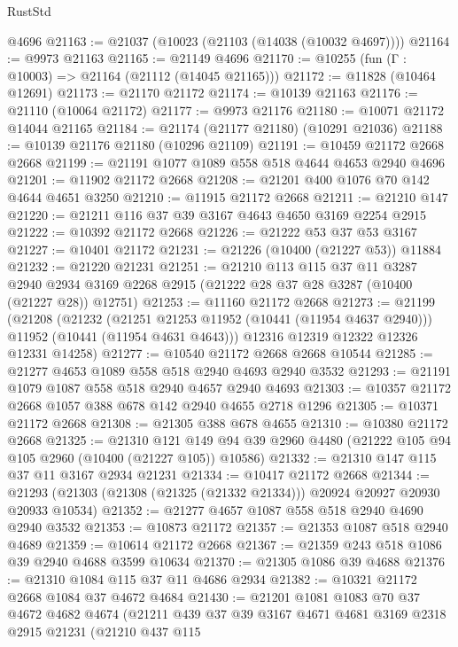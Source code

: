 \begin{lexlean}{RustStd}
\begin{coremodule}
    @4696
@21163 := @21037 (@10023 (@21103 (@14038 (@10032 @4697))))
@21164 := @9973 @21163
@21165 := @21149 @4696
@21170 := @10255 (fun (Γ : @10003) => @21164 (@21112 (@14045 @21165)))
@21172 := @11828 (@10464 @12691)
@21173 := @21170 @21172
@21174 := @10139 @21163
@21176 := @21110 (@10064 @21172)
@21177 := @9973 @21176
@21180 := @10071 @21172 @14044 @21165
@21184 := @21174 (@21177 @21180) (@10291 @21036)
@21188 := @10139 @21176 @21180 (@10296 @21109)
@21191 := @10459 @21172 @2668 @2668
@21199 := @21191 @1077 @1089 @558 @518 @4644 @4653 @2940 @4696
@21201 := @11902 @21172 @2668
@21208 := @21201 @400 @1076 @70 @142 @4644 @4651 @3250
@21210 := @11915 @21172 @2668
@21211 := @21210 @147
@21220 := @21211 @116 @37 @39 @3167 @4643 @4650 @3169 @2254 @2915
@21222 := @10392 @21172 @2668
@21226 := @21222 @53 @37 @53 @3167
@21227 := @10401 @21172
@21231 := @21226 (@10400 (@21227 @53)) @11884
@21232 := @21220 @21231
@21251 := @21210
    @113
    @115
    @37
    @11
    @3287
    @2940
    @2934
    @3169
    @2268
    @2915
    (@21222 @28 @37 @28 @3287 (@10400 (@21227 @28)) @12751)
@21253 := @11160 @21172 @2668
@21273 := @21199
    (@21208
      (@21232
        (@21251 @21253 @11952 (@10441 (@11954 @4637 @2940)))
        @11952
        (@10441 (@11954 @4631 @4643)))
      @12316
      @12319
      @12322
      @12326
      @12331
      @14258)
@21277 := @10540 @21172 @2668 @2668 @10544
@21285 := @21277 @4653 @1089 @558 @518 @2940 @4693 @2940 @3532
@21293 := @21191 @1079 @1087 @558 @518 @2940 @4657 @2940 @4693
@21303 := @10357 @21172 @2668 @1057 @388 @678 @142 @2940 @4655 @2718 @1296
@21305 := @10371 @21172 @2668
@21308 := @21305 @388 @678 @4655
@21310 := @10380 @21172 @2668
@21325 := @21310
    @121
    @149
    @94
    @39
    @2960
    @4480
    (@21222 @105 @94 @105 @2960 (@10400 (@21227 @105)) @10586)
@21332 := @21310 @147 @115 @37 @11 @3167 @2934 @21231
@21334 := @10417 @21172 @2668
@21344 := @21293 (@21303 (@21308 (@21325 (@21332 @21334))) @20924 @20927 @20930 @20933 @10534)
@21352 := @21277 @4657 @1087 @558 @518 @2940 @4690 @2940 @3532
@21353 := @10873 @21172
@21357 := @21353 @1087 @518 @2940 @4689
@21359 := @10614 @21172 @2668
@21367 := @21359 @243 @518 @1086 @39 @2940 @4688 @3599 @10634
@21370 := @21305 @1086 @39 @4688
@21376 := @21310 @1084 @115 @37 @11 @4686 @2934
@21382 := @10321 @21172 @2668 @1084 @37 @4672 @4684
@21430 := @21201
    @1081
    @1083
    @70
    @37
    @4672
    @4682
    @4674
    (@21211
      @439
      @37
      @39
      @3167
      @4671
      @4681
      @3169
      @2318
      @2915
      @21231
      (@21210
        @437
        @115

\end{coremodule}
\end{lexlean}
